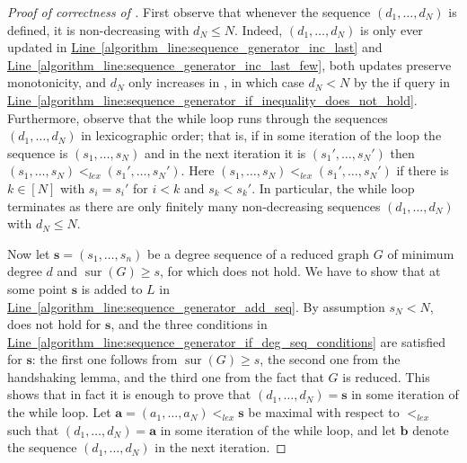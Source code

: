 \documentclass[a4paper,11pt,oneside]{scrartcl}
\theoremstyle{definition}
\theoremstyle{remark}
\DeclareMathOperator{\sur}{sur}
\newcommand{\lineref}[1]{\hyperref[#1]{Line~\ref{#1}}}
\begin{document}
\begin{proof}[Proof of correctness of ]
    First observe that whenever the sequence $(d_1, \dots, d_N)$ is defined, it is non-decreasing with $d_N \leq N$. Indeed, $(d_1,\dots,d_N)$ is only ever updated in \lineref{algorithm_line:sequence_generator_inc_last} and \lineref{algorithm_line:sequence_generator_inc_last_few}, both updates preserve monotonicity, and $d_N$ only increases in , in which case $d_N < N$ by the if query in \lineref{algorithm_line:sequence_generator_if_inequality_does_not_hold}. Furthermore, observe that the while loop runs through the sequences $(d_1,\dots,d_N)$ in lexicographic order; that is, if in some iteration of the loop the sequence is $(s_1,\dots,s_N)$ and in the next iteration it is $(s_1',\dots,s_N')$ then $(s_1, \dots, s_N) <_{lex} (s_1',\dots,s_N')$. Here $(s_1, \dots, s_N) <_{lex} (s_1',\dots,s_N')$ if there is $k \in [N]$ with $s_i = s_i'$ for $i < k$ and $s_{k} < s_{k}'$. In particular, the while loop terminates as there are only finitely many non-decreasing sequences $(d_1,\dots,d_N)$ with $d_N \leq N$.
    
    Now let $\mathbf s=(s_1,\dots, s_n)$ be a degree sequence of a reduced graph $G$ of minimum degree $d$ and $\sur(G) \geq s$, for which  does not hold. We have to show that at some point $\mathbf s$ is added to $L$ in \lineref{algorithm_line:sequence_generator_add_seq}. By assumption $s_N < N$,  does not hold for $\mathbf s$, and the three conditions in \lineref{algorithm_line:sequence_generator_if_deg_seq_conditions} are satisfied for $\mathbf s$: the first one follows from $\sur(G) \geq s$, the second one from the handshaking lemma, and the third one from the fact that $G$ is reduced. This shows that in fact it is enough to prove that $(d_1,\dots,d_N) = \mathbf s$ in some iteration of the while loop. Let $\mathbf a=(a_1,\dots,a_N)<_{lex} \mathbf s$ be maximal with respect to $<_{lex}$ such that $(d_1,\dots,d_N) = \mathbf a$ in some iteration of the while loop, and let $\mathbf b$ denote the sequence $(d_1,\dots,d_N)$ in the next iteration.
    

\end{proof}
\end{document}
